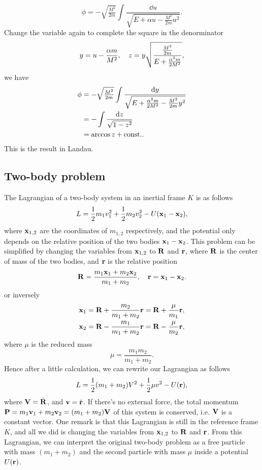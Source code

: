 \documentclass[10pt]{article}
\begin{document}
\begin{equation}
	\phi = - \sqrt{\tfrac{M^2}{2m}} \int \frac{\dd{u}}{\sqrt{E + \alpha u - \tfrac{M^2}{2m} u^2}}.
\end{equation}
Change the variable again to complete the square in the denorminator
\begin{equation}
	y = u - \frac{\alpha m }{M^2}\qc z = y \sqrt{\frac{\tfrac{M^2}{2m}}{E + \tfrac{\alpha^2 m }{2M^2}}},
\end{equation}
we have
\begin{align*}
	\phi &= - \sqrt{\tfrac{M^2}{2m}} \int \frac{\dd{y}}{\sqrt{E + \tfrac{\alpha^2 m }{2M^2} - \tfrac{M^2}{2m}y^2}} \\
	&= - \int \frac{\dd{z}}{\sqrt{1-z^2}}\\
	&= \arccos{z} + {\mathrm{const.}}.
\end{align*}
This is the result in Landau.

\subsection{Two-body problem}
The Lagrangian of a two-body system in an inertial frame $K$ is as follows
\begin{equation}
	L = \frac{1}{2}m_1 v_1^2 + \frac{1}{2}m_2 v_2^2 - U(\vb{x}_1 - \vb{x}_2),
\end{equation}
where $\vb{x}_{1,2}$ are the coordinates of $m_{1,2}$ respectively, and the potential only depends on the relative position of the two bodies $\vb{x}_1 - \vb{x}_2$. This problem can be simplified by changing the variables from $\vb{x}_{1,2}$ to $\vb{R}$ and $\vb{r}$, where $\vb{R}$ is the center of mass of the two bodies, and $\vb{r}$ is the relative position
\begin{equation}
	\vb{R} = \frac{m_1 \vb{x}_1 + m_2 \vb{x}_2}{m_1 + m_2}\qc \vb{r} = \vb{x}_1 - \vb{x}_2.
\end{equation}
or inversely
\begin{align}
	\vb{x}_1 &= \vb{R} + \frac{m_2}{m_1 + m_2} \vb{r} = \vb{R} + \frac{\mu}{m_1} \vb{r}, \\
	\vb{x}_2 &= \vb{R} - \frac{m_1}{m_1 + m_2} \vb{r} = \vb{R} - \frac{\mu}{m_2} \vb{r},
\end{align}
where $\mu$ is the reduced mass
\begin{equation}
	\mu = \frac{m_1 m_2}{m_1 + m_2}.
\end{equation}
Hence after a little calculation, we can rewrite our Lagrangian as follows
\begin{equation}
	L = \frac{1}{2}(m_1 + m_2) V^2 + \frac{1}{2}\mu v^2 - U(\vb{r}),
\end{equation}
where $\vb{V} = \dot{\vb{R}}$, and $\vb{v} = \dot{\vb{r}}$. If there's no external force, the total momentum $\vb{P} = m_1 \vb{v}_1 + m_2 \vb{v}_2 = (m_1 + m_2) \vb{V}$ of this system is conserved, i.e. $\vb{V}$ is a constant vector.
One remark is that this Lagrangian is still in the reference frame $K$, and all we did is changing the variables from $\vb{x}_{1,2}$ to $\vb{R}$ and $\vb{r}$. From this Lagrangian, we can interpret the original two-body problem as a free particle with mass $(m_1 + m_2)$ and the second particle with mass $\mu$ inside a potential $U(\vb{r})$.
\end{document}
